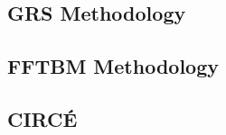 

\subsection{GRS Methodology}\label{sub:intro_grs_method}

\subsection{FFTBM Methodology}\label{sub:intro_fftbm_method}

\subsection{CIRC\'E}\label{sub:intro_circe_method}
